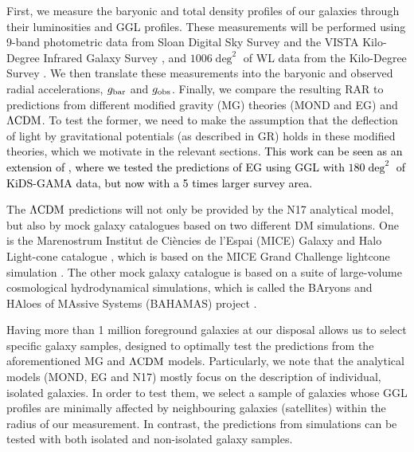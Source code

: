 \documentclass[usenatbib]{mnras}
\newcommand{\lcdm}{{\rm \Lambda CDM}}
\newcommand{\un}[1]{_{\rm #1}}
\begin{document}
First, we measure the baryonic and total density profiles of our galaxies through their luminosities and GGL profiles. These measurements will be performed using 9-band photometric data from Sloan Digital Sky Survey \cite[SDSS,]{abazajian2009} and the VISTA Kilo-Degree Infrared Galaxy Survey \cite[VIKING]{edge2013}, and $1006 \deg^2$ of WL data from the Kilo-Degree Survey \textcolor{black}{\cite[KiDS-1000;][]{dejong2013,kuijken2019}}. We then translate these measurements into the baryonic and observed radial accelerations, $g\un{bar}$ and $g\un{obs}$. Finally, we compare the resulting RAR to predictions from different modified gravity (MG) theories (MOND and EG) and $\lcdm$. To test the former, we need to make the assumption that the deflection of light by gravitational potentials (as described in GR) holds in these modified theories, which we motivate in the relevant sections. \textcolor{black}{This work can be seen as an extension of \cite{brouwer2017}, where we tested the predictions of EG using GGL with $180 \deg^2$ of KiDS-GAMA data, but now with a 5 times larger survey area.}

The $\lcdm$ predictions will not only be provided by the N17 analytical model, but also by mock galaxy catalogues based on two different DM simulations. One is the Marenostrum Institut de Ci{\`e}ncies de l'Espai (MICE) Galaxy and Halo Light-cone catalogue \cite[]{carretero2015,hoffmann2015}, which is based on the MICE Grand Challenge lightcone simulation \cite[MICE-GC,][]{fosalba2015a,fosalba2015b,crocce2015}. The other mock galaxy catalogue is based on a suite of large-volume cosmological hydrodynamical simulations, which is called the BAryons and HAloes of MAssive Systems (BAHAMAS) project \cite[]{mccarthy2017}.

Having more than 1 million foreground galaxies at our disposal allows us to select specific galaxy samples, designed to optimally test the predictions from the aforementioned MG and $\lcdm$ models. Particularly, we note that the analytical models (MOND, EG and N17) mostly focus on the description of individual, isolated galaxies. In order to test them, we select a sample of galaxies whose GGL profiles are minimally affected by neighbouring galaxies (satellites) within the radius of our measurement. In contrast, the predictions from simulations can be tested with both isolated and non-isolated galaxy samples.
\end{document}
